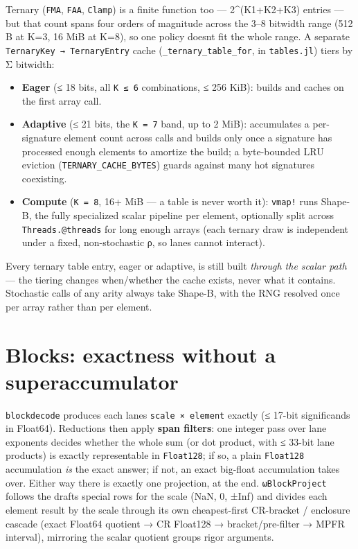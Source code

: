 Ternary (\texttt{FMA}, \texttt{FAA}, \texttt{Clamp}) is a finite function too — 2{\textasciicircum}(K1+K2+K3) entries — but that count spans four orders of magnitude across the 3–8 bitwidth range (512 B at K=3, 16 MiB at K=8), so one policy doesn{\textquotesingle}t fit the whole range. A separate \texttt{TernaryKey → TernaryEntry} cache (\texttt{\_ternary\_table\_for}, in \texttt{tables.jl}) tiers by Σ bitwidth:



\begin{itemize}
\item \textbf{Eager} (≤ 18 bits, all \texttt{K ≤ 6} combinations, ≤ 256 KiB): builds and caches on the first array call.


\item \textbf{Adaptive} (≤ 21 bits, the \texttt{K = 7} band, up to 2 MiB): accumulates a per-signature element count across calls and builds only once a signature has processed enough elements to amortize the build; a byte-bounded LRU eviction (\texttt{TERNARY\_CACHE\_BYTES}) guards against many hot signatures coexisting.


\item \textbf{Compute} (\texttt{K = 8}, 16+ MiB — a table is never worth it): \texttt{vmap!} runs Shape-B, the fully specialized scalar pipeline per element, optionally split across \texttt{Threads.@threads} for long enough arrays (each ternary draw is independent under a fixed, non-stochastic ρ, so lanes cannot interact).

\end{itemize}


Every ternary table entry, eager or adaptive, is still built \emph{through the scalar path} — the tiering changes when/whether the cache exists, never what it contains. Stochastic calls of any arity always take Shape-B, with the RNG resolved once per array rather than per element.



\section{Blocks: exactness without a superaccumulator}



\label{10094224062570944436}{}


\texttt{blockdecode} produces each lane{\textquotesingle}s \texttt{scale × element} exactly (≤ 17-bit significands in Float64). Reductions then apply \textbf{span filters}: one integer pass over lane exponents decides whether the whole sum (or dot product, with ≤ 33-bit lane products) is exactly representable in \texttt{Float128}; if so, a plain \texttt{Float128} accumulation \emph{is} the exact answer; if not, an exact big-float accumulation takes over. Either way there is exactly one projection, at the end. \texttt{ωBlockProject} follows the draft{\textquotesingle}s special rows for the scale (NaN, 0, ±Inf) and divides each element result by the scale through its own cheapest-first CR-bracket / enclosure cascade (exact Float64 quotient → CR Float128 → bracket/pre-filter → MPFR interval), mirroring the scalar quotient group{\textquotesingle}s rigor arguments.



